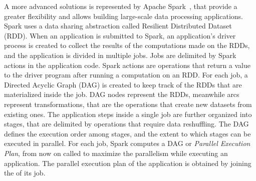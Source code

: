 A more advanced solutions is represented by Apache Spark~\cite{misc:ApacheSpark}, that provide a greater flexibility and allows building large-scale data processing applications.
Spark uses a data sharing abstraction called Resilient Distributed Dataset (RDD). When an application is submitted to Spark, an application’s driver process is created to collect the results of the computations made on the RDDs, and the application is divided in multiple jobs. Jobs are delimited by Spark actions in the application code. Spark actions are  operations that return a value to the driver program after running a computation on an RDD.
For each job, a Directed Acyclic Graph (DAG) is created to keep track of the RDDs that are materialized inside the job. DAG nodes represent the RDDs, meanwhile arcs represent transformations, that are the operations that create new datasets from existing ones.
The application steps inside a single job are further organized into stages, that are delimited by operations that require data reshuffling. The DAG defines the execution order among stages, and the extent to which stages can be executed in parallel. For each job, Spark computes a DAG or \textit{Parallel Execution Plan}, from now on called \plan to maximize the parallelism while executing an application. The parallel execution plan of the application is obtained by joining the \plans of its job.
